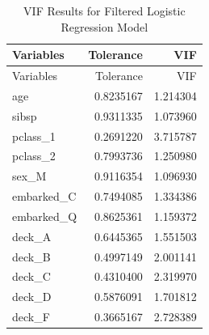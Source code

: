 \documentclass[
  letterpaper,
  DIV=11,
  numbers=noendperiod]{scrartcl}
\begin{document}
\begin{longtable}[]{@{}lrr@{}}
\caption{VIF Results for Filtered Logistic Regression
Model}\tabularnewline
\toprule\noalign{}
Variables & Tolerance & VIF \\
\midrule\noalign{}
\endfirsthead
\toprule\noalign{}
Variables & Tolerance & VIF \\
\midrule\noalign{}
\endhead
\bottomrule\noalign{}
\endlastfoot
age & 0.8235167 & 1.214304 \\
sibsp & 0.9311335 & 1.073960 \\
pclass\_1 & 0.2691220 & 3.715787 \\
pclass\_2 & 0.7993736 & 1.250980 \\
sex\_M & 0.9116354 & 1.096930 \\
embarked\_C & 0.7494085 & 1.334386 \\
embarked\_Q & 0.8625361 & 1.159372 \\
deck\_A & 0.6445365 & 1.551503 \\
deck\_B & 0.4997149 & 2.001141 \\
deck\_C & 0.4310400 & 2.319970 \\
deck\_D & 0.5876091 & 1.701812 \\
deck\_F & 0.3665167 & 2.728389 \\
\end{longtable}
\end{document}
